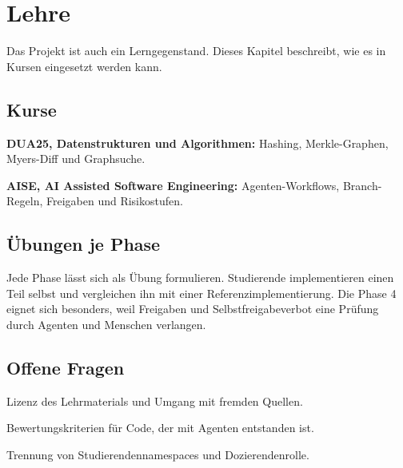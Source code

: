\chapter{Lehre}

Das Projekt ist auch ein Lerngegenstand. Dieses Kapitel beschreibt, wie es in Kursen eingesetzt werden kann.

\section{Kurse}

\startitemize
\item \textbf{DUA25, Datenstrukturen und Algorithmen:} Hashing, Merkle-Graphen, Myers-Diff und Graphsuche.
\item \textbf{AISE, AI Assisted Software Engineering:} Agenten-Workflows, Branch-Regeln, Freigaben und Risikostufen.
\stopitemize

\section{Übungen je Phase}

Jede Phase lässt sich als Übung formulieren. Studierende implementieren einen Teil selbst und vergleichen ihn mit einer Referenzimplementierung. Die Phase 4 eignet sich besonders, weil Freigaben und Selbstfreigabeverbot eine Prüfung durch Agenten und Menschen verlangen.

\section{Offene Fragen}

\startitemize
\item Lizenz des Lehrmaterials und Umgang mit fremden Quellen.
\item Bewertungskriterien für Code, der mit Agenten entstanden ist.
\item Trennung von Studierendennamespaces und Dozierendenrolle.
\stopitemize
